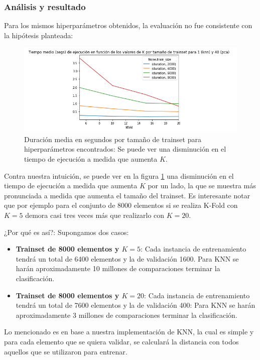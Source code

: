 \subsubsection*{Análisis y resultado}

Para los mismos hiperparámetros obtenidos, la evaluación no fue consistente con la hipótesis planteada:

\begin{figure}[H]
    \centering
    \includegraphics[scale=0.7]{images/KFoldDurationTrainSize.png}
    \caption{Duración media en segundos por tamaño de trainset para hiperparámetros encontrados: Se puede ver una disminución en el tiempo de ejecución a medida que aumenta $K$.}
    \label{fig:KFoldDurationTrainSize}
\end{figure}

Contra nuestra intuición, se puede ver en la figura \ref{fig:KFoldDurationTrainSize} una disminución en el tiempo de ejecución a medida que aumenta $K$ por un lado, la que se muestra más pronunciada a medida que aumenta el tamaño del trainset. Es interesante notar que por ejemplo para el conjunto de 8000 elementos si se realiza K-Fold con $K=5$ demora casi tres veces más que realizarlo con $K=20$. 

¿Por qué es así?: Supongamos dos casos:

\begin{itemize}
    \item \textbf{Trainset de 8000 elementos y $K=5$}: Cada instancia de entrenamiento tendrá un total de 6400 elementos y la de validación 1600. Para KNN se harán aproximadamente 10 millones de comparaciones terminar la clasificación.
    \item \textbf{Trainset de 8000 elementos y $K=20$}: Cada instancia de entrenamiento tendrá un total de 7600 elementos y la de validación 400: Para KNN se harán aproximadamente 3 millones de comparaciones terminar la clasificación.
\end{itemize}

Lo mencionado es en base a nuestra implementación de KNN, la cual es simple y para cada elemento que se quiera validar, se calculará la distancia con todos aquellos que se utilizaron para entrenar.

